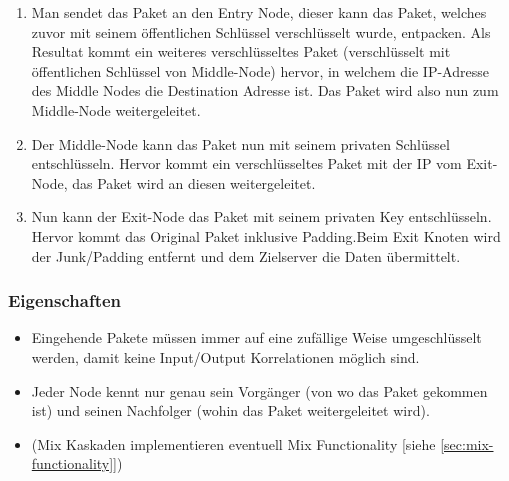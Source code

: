 \begin{enumerate}
	\begin{enumerate}
	    \item Man sendet das Paket an den Entry Node, dieser kann das Paket, welches zuvor mit seinem öffentlichen Schlüssel verschlüsselt wurde, entpacken. Als Resultat kommt ein weiteres verschlüsseltes Paket (verschlüsselt mit öffentlichen Schlüssel von Middle-Node) hervor, in welchem die IP-Adresse des Middle Nodes die Destination Adresse ist. Das Paket wird also nun zum Middle-Node weitergeleitet.
	    \item Der Middle-Node kann das Paket nun mit seinem privaten Schlüssel entschlüsseln. Hervor kommt ein verschlüsseltes Paket mit der IP vom Exit-Node, das Paket wird an diesen weitergeleitet.
	    \item Nun kann der Exit-Node das Paket mit seinem privaten Key entschlüsseln. Hervor kommt das Original Paket inklusive Padding.Beim Exit Knoten wird der Junk/Padding entfernt und dem Zielserver die Daten übermittelt.
	\end{enumerate}
\end{enumerate}

\subsubsection{Eigenschaften}
\begin{itemize}
	\item Eingehende Pakete müssen immer auf eine zufällige Weise umgeschlüsselt werden, damit keine Input/Output Korrelationen möglich sind.
	\item Jeder Node kennt nur genau sein Vorgänger (von wo das Paket gekommen ist) und seinen Nachfolger (wohin das Paket weitergeleitet wird).
	\item (Mix Kaskaden implementieren eventuell Mix Functionality [siehe \ref{sec:mix-functionality}])
\end{itemize}

